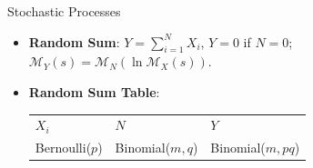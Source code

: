 \documentclass[landscape,a4paper]{article}
\begin{document}
\begin{cheatsheetcolumns}
\begin{card}{Stochastic Processes}
\begin{itemize}
\begin{itemize}
					\item \textbf{Independent}: Numbers of arrivals in \textbf{disjoint} time intervals are independent.
					\item \textbf{Small $\delta$}: $P(0,\delta)=1-\lambda\delta+o(\delta)$, $P(1,\delta)=\lambda\delta+o(\delta)$, \\$P(k,\delta)=o(\delta),k>1$,
					\item \textbf{Bernoulli Relation}: Select time infinitesimal $\delta$, $n=t/\delta$, $p=\lambda\delta$;\\
					$\left\{X_i\right\}$ is a Bernoulli SP($p$), $S_n=\sum_{k=1}^n X_i \sim $ Binomial RV$(n,p)$ $\to N_t \sim$ Poisson RV $(\lambda t)$, $n\to\infty$,
					\item \textbf{First Arrival}: $Y_1=T_1\sim\operatorname{Exp}(\lambda)$; $F_{Y_1}(t)=1-\e^{-\lambda t}$, $f_{Y_1}(t)=\lambda\e^{-\lambda t}$; 
					\item \textbf{Interarrival}: $Y_k=$ time of $k$th arrival, $T_1=Y_1$, $T_k=Y_k-Y_{k-1}$;\\$T_i\sim$ i.i.d. $\operatorname{Exp}(\lambda)$, $Y_k=\sum_{i=1}^kT_i$,
					\item \textbf{$k$-th arrival}: $Y_k\sim \operatorname{Erlang}(\lambda, k)$,
					\begin{itemize}
						\item $f_{Y_k}(y)=\lambda^ky^{k-1}\e^{-\lambda y}/(k-1)!$, $y\ge0$;
						\item $\EE[Y_k]=k/\lambda$, $\var(Y_k)=k/\lambda^2$,
					\end{itemize}
					\item \textbf{Splitting}: keep w.p. $p\Rightarrow\operatorname{Poisson}(\lambda p)$,
					\item \textbf{Merging Independent Poissons}: $\operatorname{Poisson}(\lambda_1)+\operatorname{Poisson}(\lambda_2)=\operatorname{Poisson}(\lambda_1+\lambda_2)$;\\next arrival from SP 1 w.p. $\lambda_1/(\lambda_1+\lambda_2)$.
				\end{itemize}
				\item \textbf{Random Sum}: $Y=\sum_{i=1}^NX_i$, $Y=0$ if $N=0$; $\mathscr{M}_Y(s)=\mathscr{M}_N(\ln\mathscr{M}_X(s))$.
				\item \textbf{Random Sum Table}:
				\begin{center}
					\begin{tabular}{@{}lll@{}}
						$X_i$ & $N$ & $Y$\\
						Bernoulli($p$) & Binomial($m,q$) & Binomial($m,pq$)\\

\end{tabular}
\end{center}
\end{itemize}
\end{card}
\end{cheatsheetcolumns}
\end{document}
